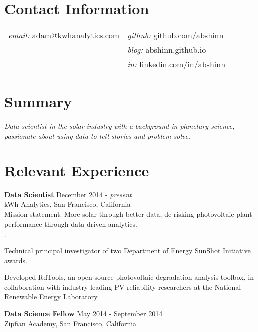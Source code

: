 \documentclass[margin,line]{res}
\newenvironment{list2}{
  \begin{list}{$\cdot$}{%
      \setlength{\itemsep}{0in}
      \setlength{\parsep}{0in} \setlength{\parskip}{0in}
      \setlength{\topsep}{0in} \setlength{\partopsep}{0in} 
      \setlength{\leftmargin}{0.2in}}}{\end{list}}
\begin{document}

\begin{resume}


\section{\sc Contact Information}

\vspace{.1 in}
\begin{tabular}{@{}p{3in}p{4in}}
{\it email:} adam@kwhanalytics.com & {\it github:} github.com/abshinn\\
& {\it blog:} abshinn.github.io\\
& {\it in:} linkedin.com/in/abshinn\\
\end{tabular}


\section{\sc Summary}

{\it Data scientist in the solar industry with a background in planetary science, passionate about
using data to tell stories and problem-solve.}


\section{\sc Relevant Experience}

{\bf Data Scientist} \hfill {December 2014 - {\em present}}\\
kWh Analytics, San Francisco, California\\
Mission statement: More solar through better data, de-risking photovoltaic plant performance through
data-driven analytics.
\begin{list2}
\item Technical principal investigator of two Department of Energy SunShot Initiative awards.
\item Developed RdTools, an open-source photovoltaic degradation analysis toolbox, in collaboration
  with industry-leading PV reliability researchers at the National Renewable Energy Laboratory.
\end{list2}

{\bf Data Science Fellow} \hfill {May 2014 - September 2014}\\
Zipfian Academy, San Francisco, California


\end{resume}
\end{document}
